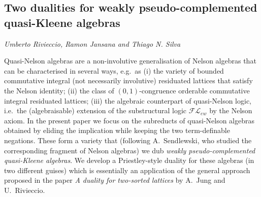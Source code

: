 \documentclass[../booklet.tex]{subfiles}
\begin{document}
\subsection[Two dualities for weakly pseudo-complemented quasi-Kleene algebras. {\it Umberto Rivieccio, Ramon Jansana and Thiago N. Silva}]{Two dualities for weakly pseudo-complemented quasi-Kleene algebras}
  

\begin{center}
  {\it Umberto Rivieccio, Ramon Jansana and Thiago N. Silva}
\end{center}

\vskip 0.8cm


Quasi-Nelson algebras are a non-involutive generalisation of Nelson algebras that
can be %
characterised in several %
ways,
e.g.~as (i) the variety of bounded commutative integral (not necessarily involutive)  residuated lattices that satisfy the Nelson identity; %
(ii) the class of $(0,1)$-congruence orderable commutative integral  residuated lattices; %
(iii) the algebraic counterpart of quasi-Nelson logic, i.e.~the 
(algebraisable) extension of the substructural logic
$\mathcal{FL}_{ew}$ %
by the Nelson axiom. 
In the present paper  we focus on the subreducts of quasi-Nelson algebras
obtained by eliding the implication while keeping the two term-definable negations.
These form a variety %
that 
(following A.~Sendlewski, who studied the corresponding fragment of Nelson algebras)
we dub \emph{weakly pseudo-complemented quasi-Kleene algebras}.
We develop a Priestley-style duality  for these algebras (in two different guises)
which is essentially an application of the %
general approach %
proposed in the paper \emph{A duality for two-sorted lattices}
by A.~Jung and U.~Rivieccio.


\end{document}
